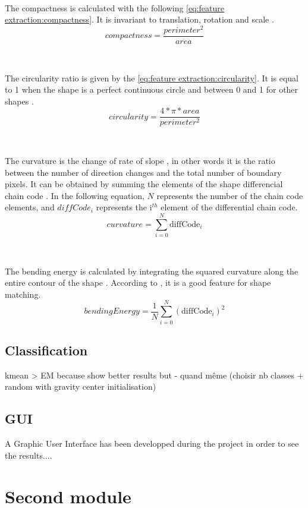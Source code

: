 
~~

The compactness is calculated with the following \vref{eq:feature extraction:compactness}. It is invariant to translation, rotation and scale  \cite{bib:chain:RepresentationAndDescription}.
\begin{equation} \label{eq:feature extraction:compactness}
compactness = \frac{perimeter^2}{area}
\end{equation}

~~

The circularity ratio is given by the \vref{eq:feature extraction:circularity}. It is equal to 1 when the shape is a perfect continuous circle and between 0 and 1 for other shapes \cite{bib:chain:ObjectDescription}.
\begin{equation} \label{eq:feature extraction:circularity}
circularity = \frac{4 * \pi * area}{perimeter^2}
\end{equation}

~~ 

The curvature is the change of rate of slope \cite{bib:chain:ObjectDescription}, in other words it is the ratio between the number of direction changes and the total number of boundary pixels. It can be obtained by summing the elements of the shape differencial chain code  \cite{bib:chain:ShapeRepresentationDescription}. In the following equation, $N$ represents the number of the chain code elements, and $diffCode_i$ represents the i$^{th}$ element of the differential chain code. 
\begin{equation}
curvature = \sum_{i = 0}^{N} \text{diffCode}_i
\end{equation}


~~

The bending energy is calculated by integrating the squared curvature along the entire contour of the shape \cite{bib:chain:ShapeRepresentationDescription}. According to \cite{bib:chain:ShapeDescriptionLesson}, it is a good feature for shape matching. 
\begin{equation}
bendingEnergy = \frac{1}{N} \sum_{i = 0}^{N} (\text{diffCode}_i)^{2}
\end{equation}



\subsection{Classification}

kmean > EM because show better results 
but - quand même (choisir nb classes + random with gravity center initialisation)


\subsection{GUI}

A Graphic User Interface has been developped during the project in order to see the results.... 


\section{Second module}

